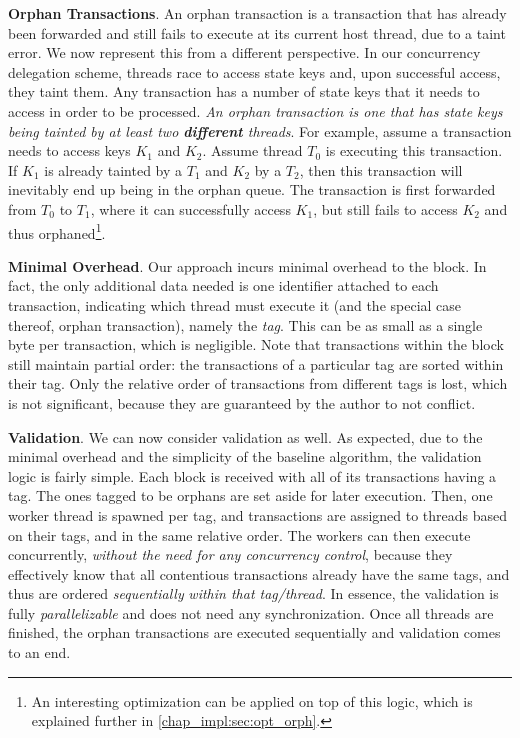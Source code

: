\textbf{Orphan Transactions}. An orphan transaction is a transaction that has already been forwarded
and still fails to execute at its current host thread, due to a taint error. We now represent this
from a different perspective. In our concurrency delegation scheme, threads race to access state
keys and, upon successful access, they taint them. Any transaction has a number of state keys that
it needs to access in order to be processed. \textit{An orphan transaction is one that has state
keys being tainted by at least two \textbf{different} threads}. For example, assume a transaction
needs to access keys $K_{1}$ and $K_{2}$. Assume thread $T_{0}$ is executing this transaction. If
$K_{1}$ is already tainted by a $T_{1}$ and $K_{2}$ by a $T_{2}$, then this transaction will
inevitably end up being in the orphan queue. The transaction is first forwarded from $T_{0}$ to
$T_{1}$, where it can successfully access $K_{1}$, but still fails to access $K_{2}$ and thus
orphaned\footnote{An interesting optimization can be applied on top of this logic, which is
explained further in \ref{chap_impl:sec:opt_orph}.}.

\textbf{Minimal Overhead}. Our approach incurs minimal overhead to the block. In fact, the only
additional data needed is one identifier attached to each transaction, indicating which thread must
execute it (and the special case thereof, orphan transaction), namely the \textit{tag}. This can be
as small as a single byte per transaction, which is negligible. Note that transactions within the
block still maintain partial order: the transactions of a particular tag are sorted within their
tag. Only the relative order of transactions from different tags is lost, which is not significant,
because they are guaranteed by the author to not conflict.

\textbf{Validation}. We can now consider validation as well. As expected, due to the minimal
overhead and the simplicity of the baseline algorithm, the validation logic is fairly simple. Each
block is received with all of its transactions having a tag. The ones tagged to be orphans are set
aside for later execution. Then, one worker thread is spawned per tag, and transactions are assigned
to threads based on their tags, and in the same relative order. The workers can then execute
concurrently, \textit{without the need for any concurrency control}, because they effectively know
that all contentious transactions already have the same tags, and thus are ordered
\textit{sequentially} \textit{within that tag/thread}. In essence, the validation is fully
\textit{parallelizable} and does not need any synchronization. Once all threads are finished, the
orphan transactions are executed sequentially and validation comes to an end.

